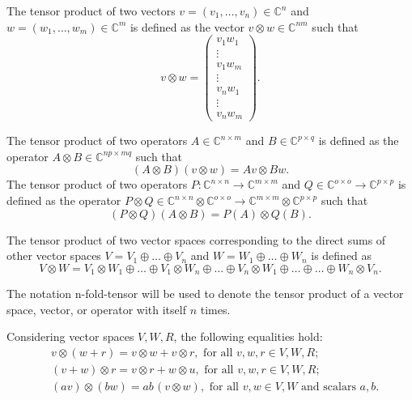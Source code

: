 The tensor product of two vectors $v = (v_1, \ldots, v_n)\in \mathbb{C}^{n}$ and $w = (w_1, \ldots, w_m) \in \mathbb{C}^{m}$ is defined as the vector $v \otimes w \in \mathbb{C}^{nm}$ such that
\begin{equation*}
  v \otimes w = \begin{pmatrix} v_1 w_1 \\ \vdots \\ v_1 w_m \\ \vdots \\ v_n w_1 \\ \vdots \\ v_n w_m \end{pmatrix}.
\end{equation*}

The tensor product of two operators $A \in \mathbb{C}^{n \times m}$ and $B \in \mathbb{C}^{p \times q}$ is defined as the operator $A \otimes B \in \mathbb{C}^{np \times mq}$ such that
\begin{equation*}
  (A \otimes B)(v \otimes w) = Av \otimes Bw.
\end{equation*}
The tensor product of two operators $P: \mathbb{C}^{n \times n} \rightarrow \mathbb{C}^{m \times m} $ and $Q \in \mathbb{C}^{o \times o} \rightarrow \mathbb{C}^{p \times p}$ is defined as the operator $ P \otimes Q \in  \mathbb{C}^{n \times n} \otimes \mathbb{C}^{o \times o} \rightarrow \mathbb{C}^{m \times m} \otimes \mathbb{C}^{p \times p}   $ such that
\begin{equation*}
  (P \otimes Q)(A \otimes B) = P (A) \otimes Q(B).
\end{equation*}

The tensor product of two vector spaces corresponding to the direct sums of other vector spaces $ V = V_1 \oplus \ldots \oplus V_n$ and  $ W = W_1 \oplus \ldots \oplus W_n$  is defined as 
\begin{equation*}
  V \otimes W = V_1 \otimes W_1 \oplus \ldots \oplus V_1 \otimes W_n  \oplus \ldots \oplus V_n \otimes W_1 \oplus \ldots   \oplus \ldots \oplus W_n \otimes V_n.
\end{equation*}

The notation \gls{n-fold-tensor}  will be used to  denote the tensor product of a vector space, vector, or operator with itself $n$ times.

Considering vector spaces $V, W, R$, the following equalities hold:
\begin{align*}
  & v \otimes (w + r) = v \otimes w + v \otimes r, \text{ for all } v,w,r \in V,W,R; \\
  & (v + w) \otimes r = v \otimes r + w \otimes u, \text{ for all } v,w,r \in V,W,R; \\
  & (a v) \otimes (b w) = ab \hspace{1pt} (v \otimes w), \text{ for all } v,w \in V,W \text{ and scalars } a, b.   \\
\end{align*}




